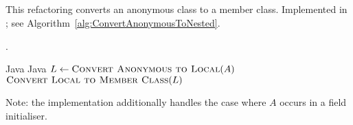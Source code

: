 \subsection{}
This refactoring converts an anonymous class to a member class. Implemented in ; see Algorithm~\ref{alg:ConvertAnonymousToNested}.

\begin{algorithm}
\caption{$\refactoring{Convert Anonymous to Nested}(A : \type{AnonymousClass}) : \type{MemberType}$}\label{alg:ConvertAnonymousToNested}.
\begin{algorithmic}[1]
\REQUIRE Java
\ENSURE Java
\medskip
\STATE $L \leftarrow \textsc{Convert Anonymous to Local}(A)$
\RETURN $\textsc{Convert Local to Member Class}(L)$
\end{algorithmic}
\end{algorithm}

Note: the implementation additionally handles the case where $A$ occurs in a field initialiser.
